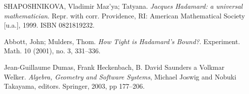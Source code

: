 \begin{thebibliography}{10}
SHAPOSHNIKOVA, Vladimir Maz'ya; Tatyana. \textit{Jacques Hadamard: a universal mathematician}.
Repr. with corr. Providence, RI: American Mathematical Society [u.a.], 1999. ISBN 0821819232.

Abbott, John; Mulders, Thom. \textit{How Tight is Hadamard's Bound?}.
Experiment. Math. 10 (2001), no. 3, 331--336.

Jean-Guillaume Dumas, Frank Heckenbach, B. David Saunders a Volkmar Welker.
\textit{Algebra, Geometry and Software Systems}, Michael Joswig and Nobuki Takayama, editors. Springer, 2003, pp 177--206.

\end{thebibliography}

\cleardoublepage
